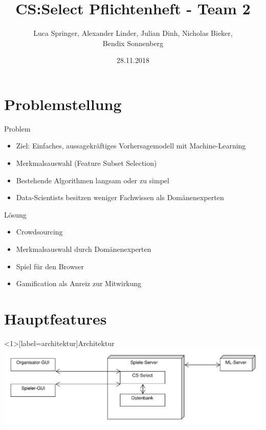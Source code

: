 \documentclass[xcolor=dvipsnames]{beamer}
\title[Team 2 - Pflichtenheft]{CS:Select Pflichtenheft - Team 2}
\author{Luca Springer, Alexander Linder, Julian Dinh, Nicholas Bieker,\\ Bendix Sonnenberg}
\date{28.11.2018}
\begin{document}
\begin{frame} %
  \titlepage
\end{frame}
\section{Problemstellung}
\begin{frame}{Problem}
    \begin{itemize}
        \item Ziel: Einfaches, aussagekräftiges Vorhersagemodell mit Machine-Learning \\
        \item Merkmalsauswahl (Feature Subset Selection) \\
        \item Bestehende Algorithmen langsam oder zu simpel \\
        \item Data-Scientists besitzen weniger Fachwissen als Domänenexperten \\
    \end{itemize}
\end{frame}
\begin{frame}{Lösung}
    \begin{itemize}
        \item Crowdsourcing \\
        \item Merkmalsauswahl durch Domänenexperten \\
        \item Spiel für den Browser \\
        \item Gamification als Anreiz zur Mitwirkung \\
    \end{itemize}
\end{frame}
\section{Hauptfeatures}
\begin{frame}<1>[label=architektur]{Architektur}
\center \includegraphics[scale=0.4]{img/Architektur.pdf}
\end{frame}
\end{document}
